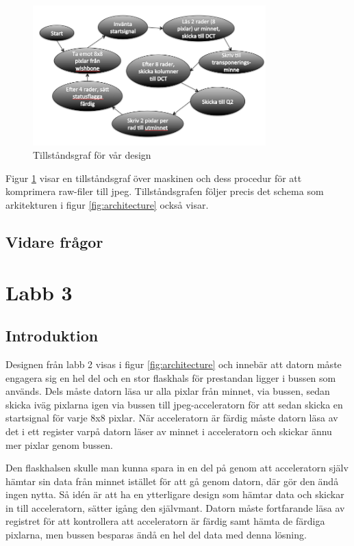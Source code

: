 \documentclass[a4paper]{article}
\begin{document}
\begin{figure}[h]
\centering
\includegraphics[width=340px]{states.png}
\caption{Tillståndsgraf för vår design}
\label{fig:state}
\end{figure}
Figur \ref{fig:state} visar en tillståndsgraf över maskinen och dess procedur för att komprimera raw-filer till jpeg. Tillståndsgrafen följer precis det schema som arkitekturen i figur \ref{fig:architecture} också visar.

\subsection{Vidare frågor}


\section{Labb 3}
\subsection{Introduktion}
Designen från labb 2 visas i figur \ref{fig:architecture} och innebär att datorn måste engagera sig en hel del och en stor flaskhals för prestandan ligger i bussen som används. Dels måste datorn läsa ur alla pixlar från minnet, via bussen, sedan skicka iväg pixlarna igen via bussen till jpeg-acceleratorn för att sedan skicka en startsignal för varje 8x8 pixlar. När acceleratorn är färdig måste datorn läsa av det i ett register varpå datorn läser av minnet i acceleratorn och skickar ännu mer pixlar genom bussen. 

Den flaskhalsen skulle man kunna spara in en del på genom att acceleratorn själv hämtar sin data från minnet istället för att gå genom datorn, där gör den ändå ingen nytta. Så idén är att ha en ytterligare design som hämtar data och skickar in till acceleratorn, sätter igång den självmant. Datorn måste fortfarande läsa av registret för att kontrollera att acceleratorn är färdig samt hämta de färdiga pixlarna, men bussen besparas ändå en hel del data med denna lösning.
\end{document}
